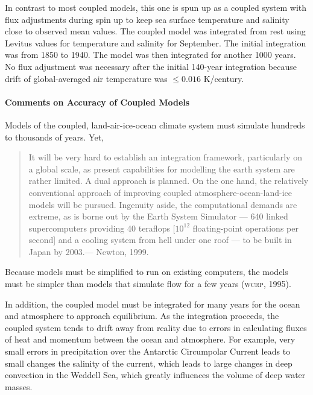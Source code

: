 In contrast to most coupled models, this one is spun up as a coupled
system with flux adjustments during spin up to keep sea surface temperature and
salinity close to observed mean values. The coupled model was
integrated from rest using Levitus values for temperature and salinity
for September. The initial integration was from 1850 to 1940. The
model was then integrated for another 1000 years. No flux adjustment
was necessary
after the initial 140-year integration because drift of
global-averaged air temperature was $\le 0.016$ K/century.

\paragraph{Comments on Accuracy of Coupled Models}
Models of the coupled,
land-air-ice-ocean climate system must simulate hundreds to thousands
of years. Yet,
\begin{quote} \small
It will be very hard to establish an integration framework,
particularly on a global scale, as present capabilities for modelling
the earth system are rather limited. A dual approach is planned. On
the one hand, the relatively conventional approach of improving
coupled atmosphere-ocean-land-ice models will be pursued.  Ingenuity
aside, the computational demands are extreme, as is borne out by the
Earth System Simulator --- 640 linked supercomputers providing 40
teraflops [$10^{12}$ floating-point operations per second] and a
cooling system from hell under one roof --- to be built in Japan by
2003.--- Newton, 1999.
\end{quote}
Because models must be simplified to run on existing computers, the
models must be simpler than models that simulate flow for a few years
(\textsc{wcrp}, 1995).

In addition, the coupled model must be integrated for many years for
the ocean and atmosphere to approach equilibrium. As the integration
proceeds, the coupled system tends to drift away from reality due to
errors in calculating fluxes of heat and momentum between the ocean
and atmosphere. For example, very small errors in precipitation over
the Antarctic Circumpolar Current
leads to small changes the salinity of the current, which leads to
large changes in deep convection in the Weddell Sea, which greatly
influences the volume of deep water masses.

